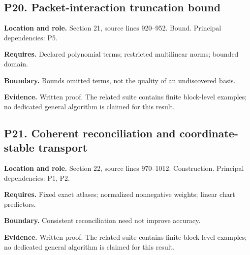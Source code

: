 \documentclass[11pt,letterpaper]{article}
\begin{document}
\par\noindent\begin{minipage}{\textwidth}
\subsection{P20. Packet-interaction truncation
bound}\label{p20.-packet-interaction-truncation-bound}

\textbf{Location and role.} Section 21, source lines 920--952. Bound.
Principal dependencies: P5.

\textbf{Requires.} Declared polynomial terms; restricted multilinear
norms; bounded domain.

\textbf{Boundary.} Bounds omitted terms, not the quality of an
undiscovered basis.

\textbf{Evidence.} Written proof. The related suite contains finite
block-level examples; no dedicated general algorithm is claimed for this
result.
\end{minipage}\par\medskip

\par\noindent\begin{minipage}{\textwidth}
\subsection{P21. Coherent reconciliation and coordinate-stable
transport}\label{p21.-coherent-reconciliation-and-coordinate-stable-transport}

\textbf{Location and role.} Section 22, source lines 970--1012.
Construction. Principal dependencies: P1, P2.

\textbf{Requires.} Fixed exact atlases; normalized nonnegative weights;
linear chart predictors.

\textbf{Boundary.} Consistent reconciliation need not improve accuracy.

\textbf{Evidence.} Written proof. The related suite contains finite
block-level examples; no dedicated general algorithm is claimed for this
result.
\end{minipage}\par\medskip
\end{document}
